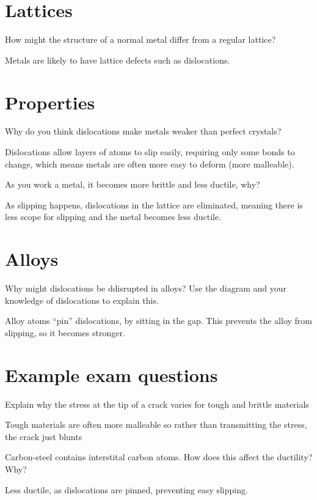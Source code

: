 \documentclass{exam}
\begin{document}
\printanswers
\section{Lattices}
\begin{questions}
\question How might the structure of a normal metal differ from a regular lattice?
\begin{solution}[.2in]
    Metals are likely to have lattice defects such as dislocations.
\end{solution}
\end{questions}
\section{Properties}
\begin{questions}
\question Why do you think dislocations make metals weaker than perfect crystals?
\begin{solution}[.2in]
    Dislocations allow layers of atoms to slip easily, requiring only some
    bonds to change, which means metals are often more easy to deform (more
    malleable).
\end{solution}
\question As you work a metal, it becomes more brittle and less ductile, why?
\begin{solution}[.2in]
    As slipping happens, dislocations in the lattice are eliminated, meaning
    there is less scope for slipping and the metal becomes less ductile.
\end{solution}
\end{questions}
\section{Alloys}
\begin{questions}
\question Why might dislocations be ddisrupted in alloys? Use the diagram and
          your knowledge of dislocations to explain this.
\begin{solution}[.2in]
    Alloy atoms ``pin'' dislocations, by sitting in the gap. This prevents the
    alloy from slipping, so it becomes stronger.
\end{solution}
\end{questions}
\section{Example exam questions}
\begin{questions}
\question Explain why the stress at the tip of a crack varies for tough and
          brittle materials
\begin{solution}[.2in]
    Tough materials are often more malleable so rather than transmitting the
    stress, the crack just blunts
\end{solution}
\question Carbon-steel contains interstital carbon atoms. How does this affect
          the ductility? Why?
\begin{solution}[.2in]
    Less ductile, as dislocations are pinned, preventing easy slipping.
\end{solution}
\end{questions}
\end{document}
